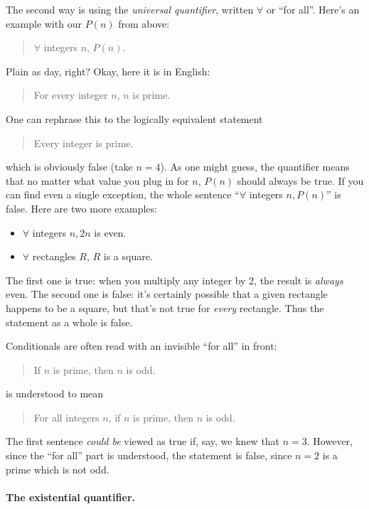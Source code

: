 \documentclass{tufte-book}
\begin{document}
The second way is using the \emph{universal quantifier}, written $\forall$ or ``for all''. Here's an example with our $P(n)$ from above:
  \begin{quote}
    $\forall$ integers $n$, $P(n)$.
  \end{quote}
  Plain as day, right? Okay, here it is in English:
  \begin{quote}
    For every integer $n$, $n$ is prime.
  \end{quote}
  One can rephrase this to the logically equivalent statement
  \begin{quote}
    Every integer is prime.
  \end{quote}
  which is obviously false (take $n = 4$). As one might guess, the quantifier means that no matter what value you plug in for $n$, $P(n)$ should always be true. If you can find even a single exception, the whole sentence ``$\forall$ integers $n, P(n)$'' is false. Here are two more examples:
  \begin{itemize}
      \item $\forall$ integers $n, 2n$ is even.
      \item $\forall$ rectangles $R$, $R$ is a square.
  \end{itemize}
  The first one is true: when you multiply any integer by 2, the result is \emph{always} even. The second one is false: it's certainly possible that a given rectangle happens to be a square, but that's not true for \emph{every} rectangle. Thus the statement as a whole is false.

Conditionals are often read with an invisible ``for all'' in front:
\begin{quote}
  If $n$ is prime, then $n$ is odd.
\end{quote}
is understood to mean
\begin{quote}
  For all integers $n$, if $n$ is prime, then $n$ is odd.
\end{quote}
The first sentence \emph{could be} viewed as true if, say, we knew that $n = 3$. However, since the ``for all'' part is understood, the statement is false, since $n = 2$ is a prime which is not odd. 


\paragraph{The existential quantifier.}
\label{sec:exist-quant}
\end{document}
